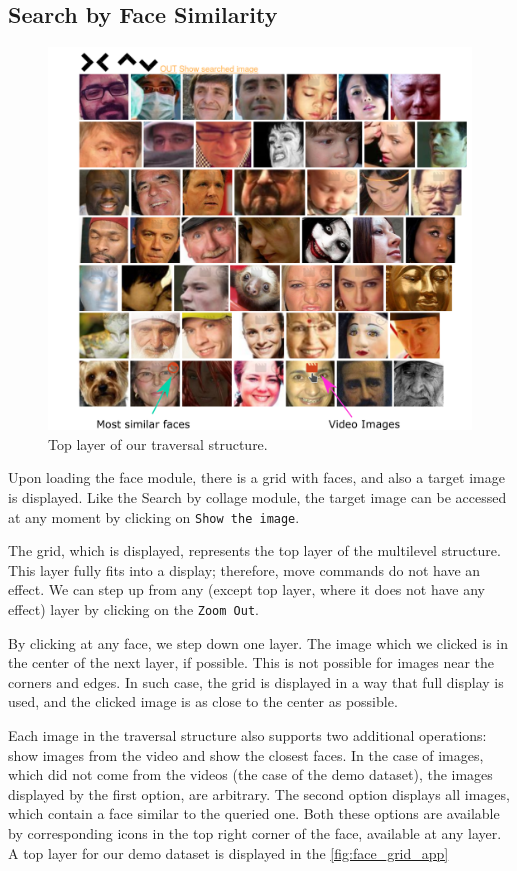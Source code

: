\subsection{Search by Face Similarity}

\begin{figure}
    \centering
    \includegraphics[width=\linewidth]{img/face_grid.png}
    \caption{Top layer of our traversal structure.}
    \label{fig:face_grid_app}
\end{figure}

Upon loading the face module, there is a grid with faces, and also a target image is displayed. Like the Search by collage module, the target image can be accessed at any moment by clicking on \verb+Show the image+. 

The grid, which is displayed, represents the top layer of the multilevel structure. This layer fully fits into a display; therefore, move commands do not have an effect. We can step up from any (except top layer, where it does not have any effect) layer by clicking on the \verb+Zoom Out+.

By clicking at any face, we step down one layer. The image which we clicked is in the center of the next layer, if possible. This is not possible for images near the corners and edges. In such case, the grid is displayed in a way that full display is used, and the clicked image is as close to the center as possible.

Each image in the traversal structure also supports two additional operations: show images from the video and show the closest faces. In the case of images, which did not come from the videos (the case of the demo dataset), the images displayed by the first option, are arbitrary. The second option displays all images, which contain a face similar to the queried one. Both these options are available by corresponding icons in the top right corner of the face, available at any layer. A top layer for our demo dataset is displayed in the \autoref{fig:face_grid_app}


